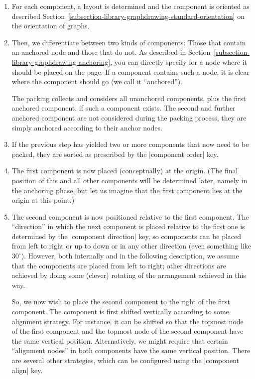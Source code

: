 \begin{enumerate}
\item For each component, a layout is determined and the component is
  oriented as described
  Section~\ref{subsection-library-graphdrawing-standard-orientation}
  on the orientation of graphs. 
\item Then, we differentiate between two kinds of components: Those
  that contain an anchored node and those that do not. As described in
  Section~\ref{subsection-library-graphdrawing-anchoring}, you can
  directly specify for a node where it should be placed on the
  page. If a component contains such a node, it is clear where the
  component should go (we call it ``anchored'').
  
  The packing collects and considers all unanchored components, plus the
  first anchored component, if such a component exists. The second and
  further anchored component are not considered during the packing
  process, they are simply anchored according to their anchor nodes. 
\item If the previous step has yielded two or more components that now
  need to be packed, they are sorted as prescribed by the
  |component order| key.
\item The first component is now placed (conceptually) at the
  origin. (The final position of this and all other components will be
  determined later, namely in the anchoring phase, but let us imagine
  that the first component lies at the origin at this point.)
\item The second component is now positioned relative to the first
  component. The ``direction'' in which the next component is placed
  relative to the first one is determined by the |component direction|
  key, so components can be placed from left to right or up to down or
  in any other direction (even something like $30^\circ$). However, both internally and in the
  following description, we assume that the components are placed from
  left to right; other directions are achieved by doing some (clever)
  rotating of the arrangement achieved in this way.

  So, we now wish to place the second component to the right of the
  first component. The component is first shifted vertically according
  to some alignment strategy. For instance, it can be shifted so that
  the topmost node of the first component and the topmost node of the
  second component have the same vertical position. Alternatively, we
  might require that certain ``alignment nodes'' in both components
  have the same vertical position. There are several other strategies,
  which can be configured using the |component align| key.


\end{enumerate}
